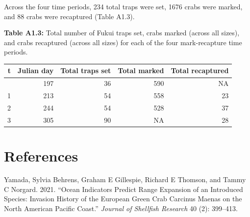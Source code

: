 \documentclass[
]{article}
\newlength{\cslhangindent}
\newenvironment{CSLReferences}[2] %
 {\begin{list}{}{%
  \setlength{\itemindent}{0pt}
  \setlength{\leftmargin}{0pt}
  \setlength{\parsep}{0pt}
  \ifodd #1
   \setlength{\leftmargin}{\cslhangindent}
   \setlength{\itemindent}{-1\cslhangindent}
  \fi
  \setlength{\itemsep}{#2\baselineskip}}}
 {\end{list}}
\begin{document}
Across the four time periods, 234 total traps were set, 1676 crabs were
marked, and 88 crabs were recaptured (Table A1.3).

\textbf{Table A1.3:} Total number of Fukui traps set, crabs marked
(across all sizes), and crabs recaptured (across all sizes) for each of
the four mark-recapture time periods.

\begin{longtable}[]{@{}rrrrr@{}}
\toprule\noalign{}
t & Julian day & Total traps set & Total marked & Total recaptured \\
\midrule\noalign{}
\endhead
\bottomrule\noalign{}
\endlastfoot
0 & 197 & 36 & 590 & NA \\
1 & 213 & 54 & 558 & 23 \\
2 & 244 & 54 & 528 & 37 \\
3 & 305 & 90 & NA & 28 \\
\end{longtable}

\section*{References}\label{references}

\label{refs}
\begin{CSLReferences}{1}{0}
Yamada, Sylvia Behrens, Graham E Gillespie, Richard E Thomson, and Tammy
C Norgard. 2021. {``Ocean Indicators Predict Range Expansion of an
Introduced Species: Invasion History of the European Green Crab Carcinus
Maenas on the North American Pacific Coast.''} \emph{Journal of
Shellfish Research} 40 (2): 399--413.

\end{CSLReferences}
\end{document}
